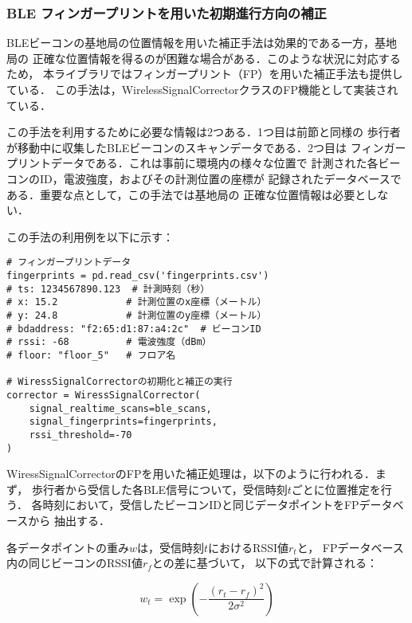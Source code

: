 
\subsubsection{BLE フィンガープリントを用いた初期進行方向の補正}

BLEビーコンの基地局の位置情報を用いた補正手法は効果的である一方，基地局の
正確な位置情報を得るのが困難な場合がある．このような状況に対応するため，
本ライブラリではフィンガープリント（FP）を用いた補正手法も提供している．
この手法は，WirelessSignalCorrectorクラスのFP機能として実装されている．

この手法を利用するために必要な情報は2つある．1つ目は前節と同様の
歩行者が移動中に収集したBLEビーコンのスキャンデータである．2つ目は
フィンガープリントデータである．これは事前に環境内の様々な位置で
計測された各ビーコンのID，電波強度，およびその計測位置の座標が
記録されたデータベースである．重要な点として，この手法では基地局の
正確な位置情報は必要としない．

この手法の利用例を以下に示す：


\begin{lstlisting}[caption={WiressSignalCorrectorの使用例},label=lst:rotate-trajectory-using-ble-fingerprint,float=ht]
# フィンガープリントデータ
fingerprints = pd.read_csv('fingerprints.csv')
# ts: 1234567890.123  # 計測時刻（秒）
# x: 15.2            # 計測位置のx座標（メートル）
# y: 24.8            # 計測位置のy座標（メートル）
# bdaddress: "f2:65:d1:87:a4:2c"  # ビーコンID
# rssi: -68          # 電波強度（dBm）
# floor: "floor_5"   # フロア名

# WiressSignalCorrectorの初期化と補正の実行
corrector = WiressSignalCorrector(
    signal_realtime_scans=ble_scans,
    signal_fingerprints=fingerprints,
    rssi_threshold=-70
)
\end{lstlisting}


WiressSignalCorrectorのFPを用いた補正処理は，以下のように行われる．まず，
歩行者から受信した各BLE信号について，受信時刻$t$ごとに位置推定を行う．
各時刻において，受信したビーコンIDと同じデータポイントをFPデータベースから
抽出する．

各データポイントの重み$w$は，受信時刻$t$におけるRSSI値$r_t$と，
FPデータベース内の同じビーコンのRSSI値$r_f$との差に基づいて，
以下の式で計算される：

\begin{equation}
w_t = \exp\left(-\frac{(r_t - r_f)^2}{2\sigma^2}\right)
\end{equation}

